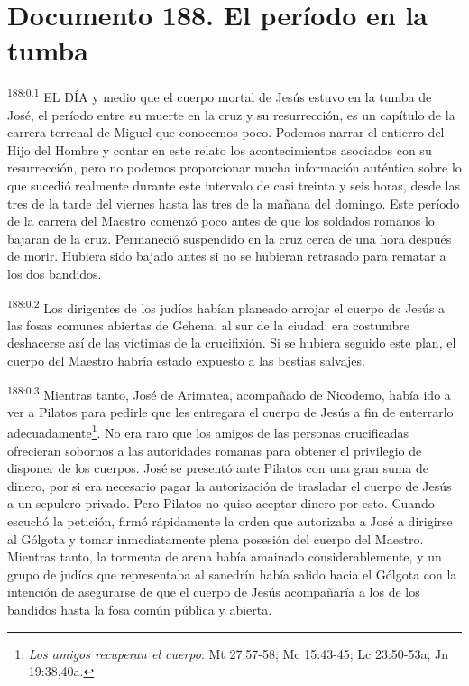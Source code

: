 \chapter{Documento 188. El período en la tumba}
\par
\textsuperscript{188:0.1} EL DÍA y medio que el cuerpo mortal de Jesús estuvo en la tumba de José, el período entre su muerte en la cruz y su resurrección, es un capítulo de la carrera terrenal de Miguel que conocemos poco. Podemos narrar el entierro del Hijo del Hombre y contar en este relato los acontecimientos asociados con su resurrección, pero no podemos proporcionar mucha información auténtica sobre lo que sucedió realmente durante este intervalo de casi treinta y seis horas, desde las tres de la tarde del viernes hasta las tres de la mañana del domingo. Este período de la carrera del Maestro comenzó poco antes de que los soldados romanos lo bajaran de la cruz. Permaneció suspendido en la cruz cerca de una hora después de morir. Hubiera sido bajado antes si no se hubieran retrasado para rematar a los dos bandidos.

\par
\textsuperscript{188:0.2} Los dirigentes de los judíos habían planeado arrojar el cuerpo de Jesús a las fosas comunes abiertas de Gehena, al sur de la ciudad; era costumbre deshacerse así de las víctimas de la crucifixión. Si se hubiera seguido este plan, el cuerpo del Maestro habría estado expuesto a las bestias salvajes.

\par
\textsuperscript{188:0.3} Mientras tanto, José de Arimatea, acompañado de Nicodemo, había ido a ver a Pilatos para pedirle que les entregara el cuerpo de Jesús a fin de enterrarlo adecuadamente\footnote{\textit{Los amigos recuperan el cuerpo}: Mt 27:57-58; Mc 15:43-45; Lc 23:50-53a; Jn 19:38,40a.}. No era raro que los amigos de las personas crucificadas ofrecieran sobornos a las autoridades romanas para obtener el privilegio de disponer de los cuerpos. José se presentó ante Pilatos con una gran suma de dinero, por si era necesario pagar la autorización de trasladar el cuerpo de Jesús a un sepulcro privado. Pero Pilatos no quiso aceptar dinero por esto. Cuando escuchó la petición, firmó rápidamente la orden que autorizaba a José a dirigirse al Gólgota y tomar inmediatamente plena posesión del cuerpo del Maestro. Mientras tanto, la tormenta de arena había amainado considerablemente, y un grupo de judíos que representaba al sanedrín había salido hacia el Gólgota con la intención de asegurarse de que el cuerpo de Jesús acompañaría a los de los bandidos hasta la fosa común pública y abierta.

